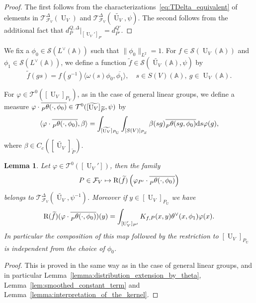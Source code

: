 \documentclass[letterpaper,11pt]{amsart}
\newcommand{\bA}{\mathbb{A}}
\newcommand{\cF}{\mathcal{F}}
\newcommand{\cS}{\mathcal{S}}
\newcommand{\cT}{\mathcal{T}}
\newcommand{\rd}{\mathrm{d}}
\newcommand{\<}{\negthickspace}
\providecommand{\aabs}[1]{\lVert#1\rVert}
\DeclareMathOperator{\U}{U}
\theoremstyle{definition}
\theoremstyle{plain}
\newtheorem{lemma}[definition]{Lemma}
\theoremstyle{remark}
\numberwithin{equation}{section}
\begin{document}
\begin{proof}
The first follows from the characterizations~\eqref{eq:TDelta_equivalent}
of elements in $\cT^\Delta_{\cF_V}(\U_V)$ and
$\cT^\Delta_{\cF_V}(\widetilde{\U_V},\psi)$. The second follows from the
additional fact that $d_{P}^{Q, \Delta}|_{[\U_V']_{P'}} = d_{P'}^{Q'}$.
\end{proof}

We fix a $\phi_0 \in \cS(L^\vee(\bA))$ such that $\aabs{\phi_0}_{L^2} = 1$. For
$f \in \cS(\U_V(\bA))$ and $\phi_1 \in \cS(L^\vee(\bA))$, we define a function
$\widetilde{f} \in \cS(\widetilde{\U_V}(\bA), \psi)$ by
    \begin{equation} \label{eq:u_tildef}
    \widetilde{f}(gs) = f(g^{-1}) \langle \omega(s) \phi_0, \overline{\phi_1} \rangle,
    \quad s \in S(V)(\bA), \ g \in \U_V(\bA).
    \end{equation}

For $\varphi \in \cT^0([\U_V]_{P_V})$, as in the case of general linear groups, we define a measure $\varphi \cdot \overline{\prescript{}{P}{\theta(\cdot,
\phi_0)}} \in \cT^0([\widetilde{\U_V}]_{\widetilde{P}},\psi)$ by
\begin{equation}
\label{eq:radon_defi_uni}
    \langle \varphi \cdot \overline{\prescript{}{P}{\theta(\cdot, \phi_0)}},
    \beta \rangle =
    \int_{[\widetilde{\U_V}]_{P_{\U}}} \int_{[S(V)]_{P_S}}
    \beta(sg)  \overline{\prescript{}{P}{\theta(sg, \phi_0)}} \rd s \varphi(g),
\end{equation}
where $\beta \in C_c([\widetilde{\U_V}]_{\widetilde{P}})$.

\begin{lemma}   \label{lemma:smoothened_constant_term_U}
Let $\varphi \in  \cT^0([\U_V'])$, then the family
    \[
    P \in \cF_V \mapsto \mathrm{R}(\widetilde{f})
    \left( \varphi_{P'} \cdot
    \overline{\prescript{}{P}{\theta(\cdot, \phi_0)}} \right)
    \]
belongs to $\cT^\Delta_{\cF_V}(\widetilde{\U_V}, \psi^{-1})$. Moreover if
$y \in [\U_V]_{P_{\U}}$ we have
    \[
    \mathrm{R}(\widetilde{f})
    (\varphi \cdot \overline{\prescript{}{P}{\theta(\cdot, \phi_0)}})(y) =
    \int_{[\U_V']_{P'}} K_{f, P}(x, y) \theta^\vee(x, \phi_1) \varphi(x).
    \]
In particular the composition of this map followed by the restriction to
$[\U_V]_{P_{\U}}$ is independent from the choice of $\phi_0$.
\end{lemma}

\begin{proof}
This is proved in the same way as in the case of general linear groups, and in
particular Lemma~\ref{lemma:distribution_extension_by_theta},
Lemma~\ref{lem:smoothed_constant_term} and
Lemma~\ref{lemma:interpretation_of_the_kernel}.
\end{proof}
\end{document}

